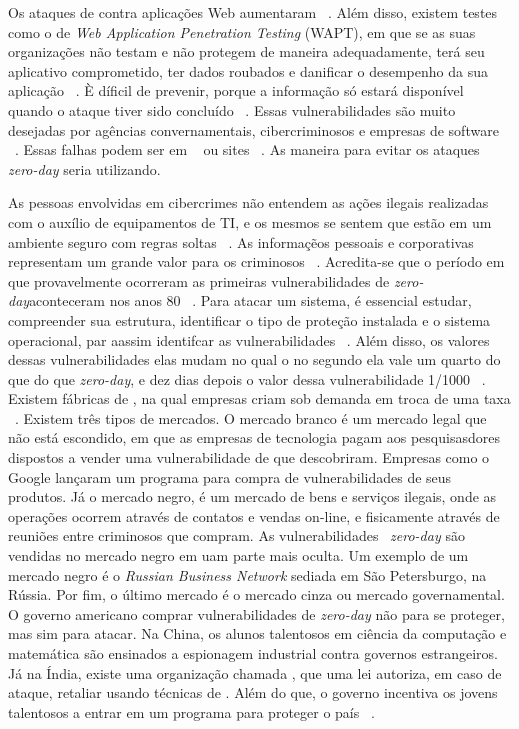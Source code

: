 \documentclass[brazil, utf8]{article}
\begin{document}
Os ataques de  contra aplicações Web aumentaram ~\cite{Kumar:2016}. Além disso, 
existem testes como o de \textit{Web Application Penetration Testing} (WAPT), em que se as suas 
organizações não testam e não protegem de maneira adequadamente, terá seu aplicativo comprometido, 
ter dados roubados e danificar o desempenho da sua aplicação ~\cite{Kumar:2016}. È díficil de 
prevenir, porque a informação só estará disponível quando o  ataque tiver sido concluído 
~\cite{Kumar:2016}. Essas vulnerabilidades são muito desejadas por agências convernamentais, 
cibercriminosos e empresas de software ~\cite{Kumar:2016}. Essas falhas podem ser em
~ ou sites ~\cite{Kumar:2016}. As maneira para evitar os ataques \textit{zero-day}
seria utilizando.

As pessoas envolvidas em cibercrimes não entendem as ações ilegais  
realizadas com o auxílio de equipamentos de TI, e os mesmos se sentem que estão em um ambiente 
seguro com regras soltas ~\cite{Armin:2015}. As informaçẽos pessoais e corporativas representam um 
grande valor para os criminosos ~\cite{Armin:2015}. Acredita-se que o período em que provavelmente 
ocorreram as primeiras vulnerabilidades de \textit{zero-day}aconteceram nos anos 80 ~\cite{
Armin:2015}. Para atacar um sistema, é essencial estudar, compreender sua estrutura, identificar o 
tipo de proteção instalada e o sistema operacional, par aassim identifcar as vulnerabilidades
~\cite{Armin:2015}. Além disso, os valores dessas vulnerabilidades elas mudam no qual o no segundo 
ela vale um quarto do que do que \textit{zero-day}, e dez dias depois o valor dessa 
vulnerabilidade 1/1000 ~\cite{Armin:2015}. Existem fábricas de , na qual empresas 
criam  sob demanda em troca de uma taxa ~\cite{Armin:2015}. Existem três tipos de 
mercados. O mercado branco é um mercado legal que não está escondido, em que as empresas de 
tecnologia pagam aos pesquisasdores dispostos a vender uma vulnerabilidade de  que 
descobriram. Empresas como o Google lançaram um programa para compra de vulnerabilidades de seus 
produtos. Já o mercado negro, é um mercado de bens e serviços ilegais, onde as operações ocorrem  
através de contatos e vendas on-line, e fisicamente através de reuniões entre criminosos que 
compram. As vulnerabilidades ~\textit{zero-day} são vendidas no mercado negro em uam parte mais 
oculta. Um exemplo de um mercado negro é o \textit{Russian Business Network} sediada em São 
Petersburgo, na Rússia. Por fim, o último mercado é o mercado cinza ou mercado governamental. O 
governo americano comprar vulnerabilidades de \textit{zero-day} não para se proteger, mas sim para 
atacar. Na China, os alunos talentosos em ciência da computação e matemática são ensinados a 
espionagem industrial contra governos estrangeiros. Já na Índia, existe uma organização chamada 
, que uma lei autoriza, em caso de ataque, 
retaliar usando técnicas de . Além do que, o governo incentiva os jovens talentosos 
a entrar em um programa para proteger o país ~\cite{Armin:2015}.
\end{document}
